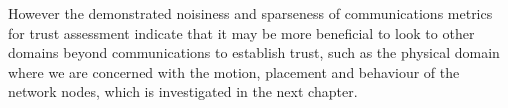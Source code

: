However the demonstrated noisiness and sparseness of communications metrics for trust assessment indicate that it may be more beneficial to look to other domains beyond communications to establish trust, such as the physical domain where we are concerned with the motion, placement and behaviour of the network nodes, which is investigated in the next chapter.
